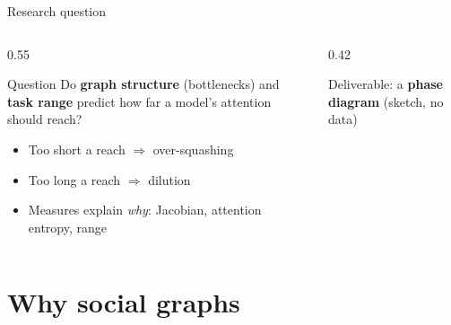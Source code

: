 \documentclass[aspectratio=169,10pt]{beamer}
\newcommand{\snote}[1]{{\scriptsize\textcolor{ink!70}{#1}}}
\begin{document}
\begin{frame}{Research question}
  \begin{columns}[c]
    \begin{column}{0.55\textwidth}
      \begin{block}{Question}
        Do \textbf{graph structure} (bottlenecks) and \textbf{task range} predict how far a model's attention should reach?
      \end{block}
      \begin{itemize}
        \item Too short a reach $\Rightarrow$ over-squashing
        \item Too long a reach $\Rightarrow$ dilution
        \item Measures explain \emph{why}: Jacobian, attention entropy, range
      \end{itemize}
    \end{column}
    \begin{column}{0.42\textwidth}
      \centering

      \snote{Deliverable: a \textbf{phase diagram} (sketch, no data)}
    \end{column}
  \end{columns}
\end{frame}

\section{Why social graphs}
\end{document}
